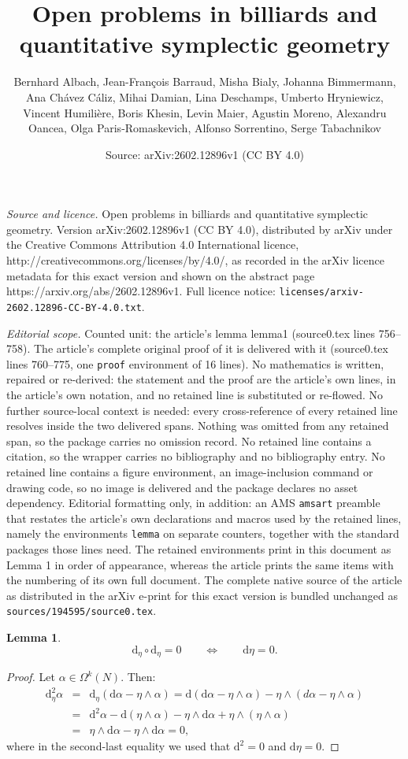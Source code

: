 \documentclass[10pt,a4paper]{amsart}
\title{Open problems in billiards and quantitative symplectic geometry}
\author{Bernhard Albach, Jean-Fran\c{c}ois Barraud, Misha Bialy, Johanna Bimmermann, Ana Ch\'avez C\'aliz, Mihai Damian, Lina Deschamps, Umberto Hryniewicz, Vincent Humili\`ere, Boris Khesin, Levin Maier, Agustin Moreno, Alexandru Oancea, Olga Paris-Romaskevich, Alfonso Sorrentino, Serge Tabachnikov}
\date{Source: arXiv:2602.12896v1 (CC BY 4.0)}
\newtheorem{lemma}{Lemma}
\def\d{\mathrm{d}}
\begin{document}
\maketitle

\noindent\emph{Source and licence.} Open problems in billiards and quantitative symplectic geometry. Version arXiv:2602.12896v1 (CC BY 4.0), distributed by arXiv under the Creative Commons Attribution 4.0 International licence, http://creativecommons.org/licenses/by/4.0/, as recorded in the arXiv licence metadata for this exact version and shown on the abstract page https://arxiv.org/abs/2602.12896v1. Full licence notice: \texttt{licenses/arxiv-2602.12896-CC-BY-4.0.txt}.\par\smallskip

\noindent\textit{Editorial scope.} Counted unit: the article's lemma lemma1 (source0.tex lines 756--758). The article's complete original proof of it is delivered with it (source0.tex lines 760--775, one \texttt{proof} environment of 16 lines). No mathematics is written, repaired or re-derived: the statement and the proof are the article's own lines, in the article's own notation, and no retained line is substituted or re-flowed.  No further source-local context is needed: every cross-reference of every retained line resolves inside the two delivered spans.  Nothing was omitted from any retained span, so the package carries no omission record.  No retained line contains a citation, so the wrapper carries no bibliography and no bibliography entry.  No retained line contains a figure environment, an image-inclusion command or drawing code, so no image is delivered and the package declares no asset dependency.  Editorial formatting only, in addition: an AMS \texttt{amsart} preamble that restates the article's own declarations and macros used by the retained lines, namely the environments \texttt{lemma} on separate counters, together with the standard packages those lines need.  The retained environments print in this document as Lemma 1 in order of appearance, whereas the article prints the same items with the numbering of its own full document.  The complete native source of the article as distributed in the arXiv e-print for this exact version is bundled unchanged as \texttt{sources/194595/source0.tex}.
\begin{lemma}\label{lemma1}
$$ \d_\eta \circ \d_\eta =0 \qquad \Longleftrightarrow \qquad \d\eta=0.$$
\end{lemma} 

\begin{proof}
Let $\alpha \in \Omega^k(N)$. Then:
\begin{eqnarray*}
\d^2_\eta \alpha &=& \d_\eta \left(
\d\alpha - \eta \wedge \alpha
\right) = \d \left(
\d\alpha - \eta \wedge \alpha
\right) - \eta \wedge \left(
d\alpha - \eta \wedge \alpha
\right) 
\\
&=& \d^2 \alpha - \d (\eta \wedge \alpha) - \eta \wedge \d\alpha + \eta \wedge \left( \eta \wedge \alpha \right)\\
&=& \eta \wedge \d \alpha - \eta \wedge \d\alpha = 0,
\end{eqnarray*}
where in the second-last equality we used that $\d^2=0$ and $\d\eta=0$.
\end{proof}
\end{document}
